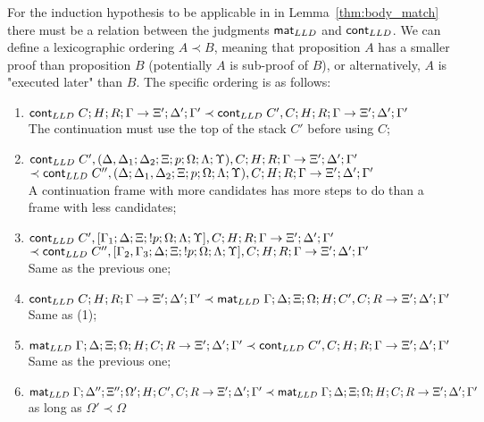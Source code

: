For the induction hypothesis to be applicable in in Lemma~\ref{thm:body_match} there must be
a relation between the judgments $\mathsf{mat}_{LLD} \;$and $\mathsf{cont}_{LLD}$.
We can define a lexicographic ordering $A \prec B$, meaning that proposition $A$ has a smaller proof than proposition $B$ (potentially $A$ is sub-proof of $B$),
or alternatively, $A$ is "executed later" than $B$.
The specific ordering is as follows:

\begin{enumerate}
   \item $\mathsf{cont}_{LLD} \; C; H; R; \Gamma \rightarrow \Xi'; \Delta'; \Gamma' \prec \mathsf{cont}_{LLD} \; C', C; H; R; \Gamma \rightarrow \Xi'; \Delta'; \Gamma'$\\
   The continuation must use the top of the stack $C'$ before using $C$;
   \item $\mathsf{cont}_{LLD} \; C', (\Delta, \Delta_1; \Delta_2; \Xi; p; \Omega; \Lambda; \Upsilon), C; H; R; \Gamma \rightarrow \Xi'; \Delta'; \Gamma'$\\
   \hspace*{1cm}$\prec \mathsf{cont}_{LLD} \; C'', (\Delta; \Delta_1, \Delta_2; \Xi; p; \Omega; \Lambda; \Upsilon), C; H; R; \Gamma \rightarrow \Xi'; \Delta'; \Gamma'$\\
   A continuation frame with more candidates has more steps to do than a frame with less candidates;
   \item $\mathsf{cont}_{LLD} \; C', [\Gamma_1; \Delta; \Xi; {!} p; \Omega; \Lambda; \Upsilon], C; H; R; \Gamma \rightarrow \Xi'; \Delta'; \Gamma'$\\
   \hspace*{1cm} $\prec \mathsf{cont}_{LLD} \; C'', [\Gamma_2, \Gamma_3; \Delta; \Xi; {!} p; \Omega; \Lambda; \Upsilon], C; H; R; \Gamma \rightarrow \Xi'; \Delta'; \Gamma'$\\
      Same as the previous one;
   \item $\mathsf{cont}_{LLD} \; C; H; R; \Gamma \rightarrow \Xi'; \Delta'; \Gamma' \prec \mathsf{mat}_{LLD} \; \Gamma; \Delta; \Xi; \Omega; H; C', C; R \rightarrow \Xi'; \Delta'; \Gamma'$\\
   Same as (1);
   \item $\mathsf{mat}_{LLD} \; \Gamma; \Delta; \Xi; \Omega; H; C; R \rightarrow \Xi'; \Delta'; \Gamma' \prec \mathsf{cont}_{LLD} \; C', C; H; R; \Gamma \rightarrow \Xi'; \Delta'; \Gamma'$\\
   Same as the previous one;
   \item $\mathsf{mat}_{LLD} \; \Gamma; \Delta''; \Xi''; \Omega'; H; C', C; R \rightarrow \Xi'; \Delta'; \Gamma' \prec \mathsf{mat}_{LLD} \; \Gamma; \Delta; \Xi; \Omega; H; C; R \rightarrow \Xi'; \Delta'; \Gamma'$ as long as $\Omega' \prec \Omega$\\

\end{enumerate}
